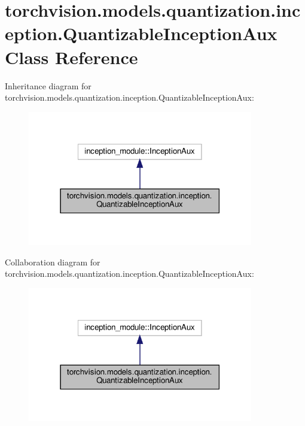 \hypertarget{classtorchvision_1_1models_1_1quantization_1_1inception_1_1QuantizableInceptionAux}{}\section{torchvision.\+models.\+quantization.\+inception.\+Quantizable\+Inception\+Aux Class Reference}
\label{classtorchvision_1_1models_1_1quantization_1_1inception_1_1QuantizableInceptionAux}


Inheritance diagram for torchvision.\+models.\+quantization.\+inception.\+Quantizable\+Inception\+Aux\+:
\nopagebreak
\begin{figure}[H]
\begin{center}
\leavevmode
\includegraphics[width=279pt]{classtorchvision_1_1models_1_1quantization_1_1inception_1_1QuantizableInceptionAux__inherit__graph}
\end{center}
\end{figure}


Collaboration diagram for torchvision.\+models.\+quantization.\+inception.\+Quantizable\+Inception\+Aux\+:
\nopagebreak
\begin{figure}[H]
\begin{center}
\leavevmode
\includegraphics[width=279pt]{classtorchvision_1_1models_1_1quantization_1_1inception_1_1QuantizableInceptionAux__coll__graph}
\end{center}
\end{figure}
